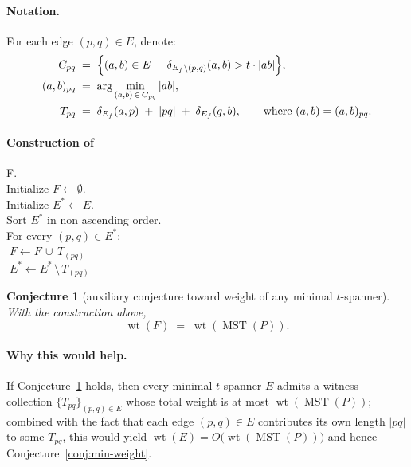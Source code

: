 \documentclass{article}
\newtheorem{conjecture}[theorem]{Conjecture}
\DeclareMathOperator{\wt}{wt}
\DeclareMathOperator{\MST}{MST}
\begin{document}
\paragraph{Notation.}
For each edge $(p,q) \in E$, denote:
\begin{align*}
  C_{pq} &\;=\; \Bigl\{(a,b) \in E \;\Bigm|\;
    \delta_{E_f\setminus(p,q)}(a,b) > t \cdot |ab|\Bigr\}, \\
  (a,b)_{pq} &\;=\; \arg\min_{(a,b)\,\in\, C_{pq}} |ab|, \\
  T_{pq} &\;=\; \delta_{E_f}(a,p) \;+\; |pq| \;+\; \delta_{E_f}(q,b),
  \qquad \text{where $(a,b)=(a,b)_{pq}$.}
\end{align*}

\paragraph{Construction of}
F.\\
Initialize $F \gets \emptyset$.\\
Initialize $E^* \gets E$.\\
Sort $E^*$ in non ascending order.\\
For every $(p,q) \in E^*$:\\
$\; F \gets F \, \cup \, T_{(pq)} $\\
$\; E^* \gets E^* \, \setminus \, T_{(pq)} $\\

\begin{conjecture}[auxiliary conjecture toward weight of any minimal $t$-spanner]
\label{conj:toward-min-weight}
With the construction above,
\[
  \wt(F) \;=\; \wt(\MST(P)).
\]
\end{conjecture}

\paragraph{Why this would help.}
If Conjecture~\ref{conj:toward-min-weight} holds, then every minimal
$t$-spanner $E$ admits a witness collection $\{T_{pq}\}_{(p,q)\in E}$
whose total weight is at most $\wt(\MST(P))$; combined with the
fact that each edge $(p,q)\in E$ contributes its own length $|pq|$ to
some $T_{pq}$, this would yield
$\wt(E) = O\!\bigl(\wt(\MST(P))\bigr)$ and hence
Conjecture~\ref{conj:min-weight}.
\end{document}
